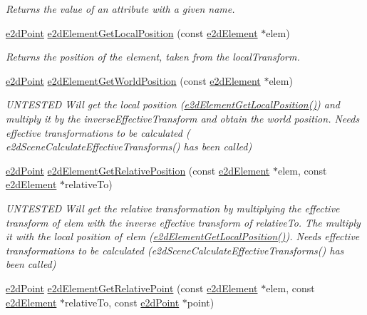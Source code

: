 \begin{DoxyCompactItemize}
\begin{DoxyCompactList}\small\item\em Returns the value of an attribute with a given name. \end{DoxyCompactList}\item 
\hyperlink{structe2d_point}{e2d\-Point} \hyperlink{group__e2d_element_ga39dd883e42f609efba3f75300a29ff31}{e2d\-Element\-Get\-Local\-Position} (const \hyperlink{structe2d_element}{e2d\-Element} $\ast$elem)
\begin{DoxyCompactList}\small\item\em Returns the position of the element, taken from the local\-Transform. \end{DoxyCompactList}\item 
\hyperlink{structe2d_point}{e2d\-Point} \hyperlink{group__e2d_element_ga9b85de42e52c0d89e82f9231ea923c8c}{e2d\-Element\-Get\-World\-Position} (const \hyperlink{structe2d_element}{e2d\-Element} $\ast$elem)
\begin{DoxyCompactList}\small\item\em U\-N\-T\-E\-S\-T\-E\-D Will get the local position (\hyperlink{group__e2d_element_ga39dd883e42f609efba3f75300a29ff31}{e2d\-Element\-Get\-Local\-Position()}) and multiply it by the inverse\-Effective\-Transform and obtain the world position. Needs effective transformations to be calculated ( e2d\-Scene\-Calculate\-Effective\-Transforms() has been called) \end{DoxyCompactList}\item 
\hyperlink{structe2d_point}{e2d\-Point} \hyperlink{group__e2d_element_gab4e3f4eeba31c937a946f68617c5cb06}{e2d\-Element\-Get\-Relative\-Position} (const \hyperlink{structe2d_element}{e2d\-Element} $\ast$elem, const \hyperlink{structe2d_element}{e2d\-Element} $\ast$relative\-To)
\begin{DoxyCompactList}\small\item\em U\-N\-T\-E\-S\-T\-E\-D Will get the relative transformation by multiplying the effective transform of elem with the inverse effective transform of relative\-To. The multiply it with the local position of elem (\hyperlink{group__e2d_element_ga39dd883e42f609efba3f75300a29ff31}{e2d\-Element\-Get\-Local\-Position()}). Needs effective transformations to be calculated (e2d\-Scene\-Calculate\-Effective\-Transforms() has been called) \end{DoxyCompactList}\item 
\hyperlink{structe2d_point}{e2d\-Point} \hyperlink{group__e2d_element_gac3ad9f8cdc0782378c9f2e93cb7da68f}{e2d\-Element\-Get\-Relative\-Point} (const \hyperlink{structe2d_element}{e2d\-Element} $\ast$elem, const \hyperlink{structe2d_element}{e2d\-Element} $\ast$relative\-To, const \hyperlink{structe2d_point}{e2d\-Point} $\ast$point)

\end{DoxyCompactItemize}
